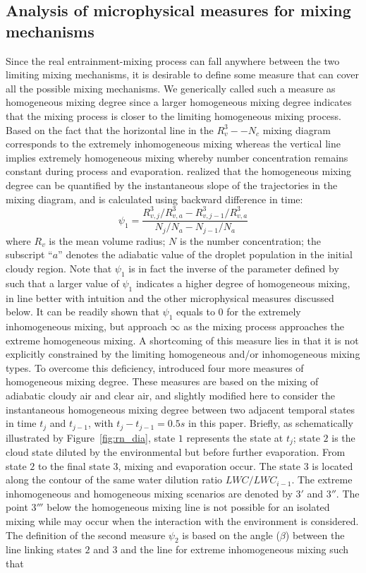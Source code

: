 \documentclass[draft,linenumbers]{agujournal}
\newcommand{\Fig}[1]{Figure~\ref{#1}}
\begin{document}
\subsection{Analysis of microphysical measures for mixing mechanisms}
Since the real entrainment-mixing process can fall anywhere between the two limiting mixing mechanisms, it is desirable to define some measure that can cover all the possible mixing mechanisms. We generically called such a measure as homogeneous mixing degree since a larger homogeneous mixing degree indicates that the mixing process is closer to the limiting homogeneous mixing process. Based on the fact that the horizontal line in the $R_v^3−-N_c$ mixing diagram corresponds to the extremely inhomogeneous mixing whereas the vertical line implies extremely homogeneous mixing { whereby number concentration remains constant during process and evaporation. \citet{And09} realized that} the homogeneous mixing degree can be quantified by the instantaneous slope of the trajectories in the mixing diagram, and is calculated using backward difference in time: 
\begin{equation}
\psi_1 = \frac{R_{v,j}^3/R_{v,a}^3 - R_{v,j-1}^3/R_{v,a}^3}{N_{j}/N_a - N_{j-1}/N_a}
\label{phi1}
\end{equation}
where $R_v$ is the mean volume radius; $N$ is the number concentration; the subscript ``$a$'' denotes the adiabatic value of the droplet population in the initial cloudy region. Note that $\psi_1$ is in fact the inverse of the parameter defined by \citet{And09} such that a larger value of $\psi_1$ indicates a higher degree of homogeneous mixing, in line better with intuition and the other microphysical measures discussed below. It can be readily shown that $\psi_1$ equals to $0$ for the extremely inhomogeneous mixing, but approach $\infty$ as the mixing process approaches the extreme homogeneous mixing. A shortcoming of this measure lies in that it is not explicitly constrained by the limiting homogeneous and/or inhomogeneous mixing types. To overcome this deficiency, \citet{Lu2013a, Lu2013b, Lu2014} introduced four more measures of homogeneous mixing degree. These measures are based on the mixing of adiabatic cloudy air and clear air, and slightly modified here to consider the instantaneous homogeneous mixing degree between two adjacent 
temporal states in time $t_j$ and $t_{j-1}${\color{green}, with $t_j - t_{j-1} = 0.5s$ in this paper}. 
Briefly, as schematically illustrated by \Fig{fig:rn_dia}, state $1$ represents the state at $t_j$; state $2$ is the cloud state diluted by the environmental but before further evaporation. From state $2$ to the final state $3$, mixing and evaporation occur. The state $3$ is located along the contour of the same water dilution ratio $LWC/LWC_{i-1}$. {\color{green} The extreme inhomogeneous and homogeneous mixing scenarios are denoted by $3'$ and $3''$. The point $3'''$ below the homogeneous mixing line is not possible for an isolated mixing while may occur when the interaction with the environment is considered.} The definition of the second measure $\psi_2$ is based on the angle ($\beta$) between the line linking states $2$ and $3$ and the line for extreme inhomogeneous mixing such that
\end{document}
